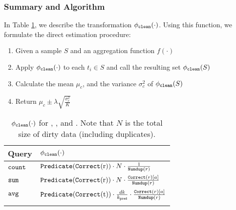 \subsubsection{Summary and Algorithm}
In Table \ref{tbl:transform-new}, we describe the transformation $\phi_{\texttt{clean} } (\cdot)$.
Using this function, we formulate the direct estimation procedure:

\begin{enumerate}
\item Given a sample $S$ and an aggregation function $f(\cdot)$\vspace{-.5em}
\item Apply $\phi_{\texttt{clean} } (\cdot)$ to each $t_i \in S$ and call the resulting set $\phi_{\texttt{clean} } (S)$\vspace{-.5em}
\item Calculate the mean $\mu_c$, and the variance $\sigma_c^2$ of $\phi_{\texttt{clean} } (S)$\vspace{-.5em}
\item Return $\mu_c \pm \lambda \sqrt{\frac{\sigma_c^2}{K}}$\vspace{-.5em}
\end{enumerate}

\begin{table}[tup]\vspace{-1em}

\small
\caption{$\phi_{\texttt{clean} } (\cdot)$ for \countfunc, \sumfunc, and \avgfunc. Note that $N$ is the total size of dirty data (including duplicates).}
\centering 
\begin{tabular}{l l}
\hline\hline
Query & $\phi_{\texttt{clean} } (\cdot)$\\
\hline  %
\vspace{.5em}
$\texttt{count}$ & $
		\Predicatec{r}\cdot N\cdot\frac{1}{\Dedup{r}{R}}
$ \\\vspace{.5em} %
$\texttt{sum} $ & $
		\Predicatec{r}\cdot N\cdot\frac{\Correct{r}[a]}{\Dedup{r}{R}}
$ \\\vspace{.5em}
$\texttt{avg} $ & $
		\Predicatec{t}\cdot \frac{dk}{k_{\pred}}\cdot\frac{\Correct{r}[a]}{\Dedup{r}{R}}
$ \\ [1ex] %
\hline %
\label{tbl:transform-new}
\end{tabular}\vspace{-2em}
\end{table}

